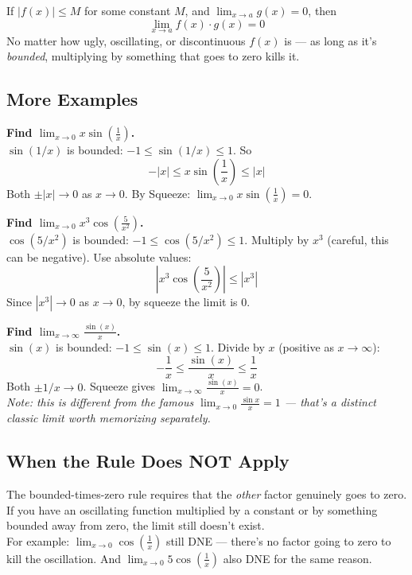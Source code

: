 \documentclass[11pt, letterpaper]{article}
\newcommand{\example}[1]{%
  \begin{tcolorbox}[colback=examplebg, colframe=exampleborder,
    title={\bfseries Example}, arc=3pt, boxrule=1pt]
  #1
  \end{tcolorbox}%
}
\newcommand{\warning}[1]{%
  \begin{tcolorbox}[colback=warnbg, colframe=warnborder,
    title={\bfseries Watch Out}, arc=3pt, boxrule=1pt]
  #1
  \end{tcolorbox}%
}
\begin{document}
\begin{tcolorbox}[colback=partbg, colframe=sectionblue,
  title={\bfseries The Bounded-Times-Zero Rule}, arc=3pt, boxrule=1pt]
If $|f(x)| \leq M$ for some constant $M$, and $\displaystyle \lim_{x \to a} g(x) = 0$, then
\[
  \lim_{x \to a} f(x) \cdot g(x) = 0
\]
No matter how ugly, oscillating, or discontinuous $f(x)$ is --- as long as it's \emph{bounded}, multiplying by something that goes to zero kills it.
\end{tcolorbox}

\subsection*{More Examples}

\example{
\textbf{Find $\displaystyle \lim_{x \to 0} x \sin\!\left(\frac{1}{x}\right)$.}\\[4pt]
$\sin(1/x)$ is bounded: $-1 \leq \sin(1/x) \leq 1$. So
\[
  -|x| \leq x \sin\!\left(\frac{1}{x}\right) \leq |x|
\]
Both $\pm|x| \to 0$ as $x \to 0$. By Squeeze: $\displaystyle \lim_{x \to 0} x \sin\!\left(\frac{1}{x}\right) = 0$.
}

\example{
\textbf{Find $\displaystyle \lim_{x \to 0} x^3 \cos\!\left(\frac{5}{x^2}\right)$.}\\[4pt]
$\cos(5/x^2)$ is bounded: $-1 \leq \cos(5/x^2) \leq 1$. Multiply by $x^3$ (careful, this can be negative). Use absolute values:
\[
  \left| x^3 \cos\!\left(\frac{5}{x^2}\right) \right| \leq |x^3|
\]
Since $|x^3| \to 0$ as $x \to 0$, by squeeze the limit is $\boxed{0}$.
}

\example{
\textbf{Find $\displaystyle \lim_{x \to \infty} \frac{\sin(x)}{x}$.}\\[4pt]
$\sin(x)$ is bounded: $-1 \leq \sin(x) \leq 1$. Divide by $x$ (positive as $x \to \infty$):
\[
  -\frac{1}{x} \leq \frac{\sin(x)}{x} \leq \frac{1}{x}
\]
Both $\pm 1/x \to 0$. Squeeze gives $\displaystyle \lim_{x \to \infty} \frac{\sin(x)}{x} = 0$.
\\[3pt]
\textit{Note: this is different from the famous $\lim_{x \to 0} \frac{\sin x}{x} = 1$ --- that's a distinct classic limit worth memorizing separately.}
}

\subsection*{When the Rule Does NOT Apply}

\warning{
The bounded-times-zero rule requires that the \emph{other} factor genuinely goes to zero. If you have an oscillating function multiplied by a constant or by something bounded away from zero, the limit still doesn't exist.
\\[4pt]
For example: $\displaystyle \lim_{x \to 0} \cos\!\left(\frac{1}{x}\right)$ still DNE --- there's no factor going to zero to kill the oscillation. And $\displaystyle \lim_{x \to 0} 5 \cos\!\left(\frac{1}{x}\right)$ also DNE for the same reason.
}
\end{document}

